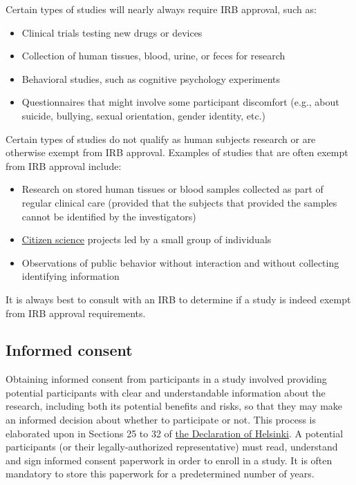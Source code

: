 \documentclass[letterpaper, 12pt]{article}
\begin{document}
Certain types of studies will nearly always require IRB approval, such as:

\begin{itemize}
    \setlength\itemsep{-0.5em}
    \item Clinical trials testing new drugs or devices
    \item Collection of human tissues, blood, urine, or feces for research
    \item Behavioral studies, such as cognitive psychology experiments
    \item Questionnaires that might involve some participant discomfort (e.g., about suicide, bullying, sexual orientation, gender identity, etc.)
\end{itemize}

Certain types of studies do not qualify as human subjects research or are otherwise exempt from IRB approval. Examples of studies that are often exempt from IRB approval include:

\begin{itemize}
    \setlength\itemsep{-0.5em}
    \item Research on stored human tissues or blood samples collected as part of regular clinical care (provided that the subjects that provided the samples cannot be identified by the investigators)
    \item \href{https://en.wikipedia.org/wiki/Citizen_science}{Citizen science} projects led by a small group of individuals
    \item Observations of public behavior without interaction and without collecting identifying information
\end{itemize}

It is always best to consult with an IRB to determine if a study is indeed exempt from IRB approval requirements.

\subsection*{Informed consent}

Obtaining informed consent from participants in a study involved providing potential participants with clear and understandable information about the research, including both its potential benefits and risks, so that they may make an informed decision about whether to participate or not. This process is elaborated upon in Sections 25 to 32 of \href{https://www.wma.net/policies-post/wma-declaration-of-helsinki/}{the Declaration of Helsinki}. A potential participants (or their legally-authorized representative) must read, understand and sign informed consent paperwork in order to enroll in a study. It is often mandatory to store this paperwork for a predetermined number of years.
\end{document}
